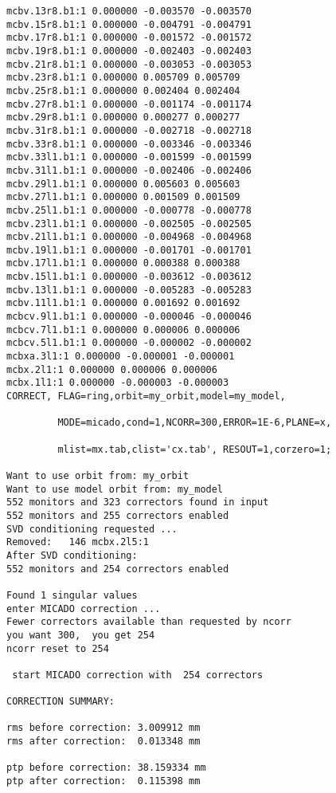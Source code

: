 \begin{verbatim}
mcbv.13r8.b1:1 0.000000 -0.003570 -0.003570
mcbv.15r8.b1:1 0.000000 -0.004791 -0.004791
mcbv.17r8.b1:1 0.000000 -0.001572 -0.001572
mcbv.19r8.b1:1 0.000000 -0.002403 -0.002403
mcbv.21r8.b1:1 0.000000 -0.003053 -0.003053
mcbv.23r8.b1:1 0.000000 0.005709 0.005709
mcbv.25r8.b1:1 0.000000 0.002404 0.002404
mcbv.27r8.b1:1 0.000000 -0.001174 -0.001174
mcbv.29r8.b1:1 0.000000 0.000277 0.000277
mcbv.31r8.b1:1 0.000000 -0.002718 -0.002718
mcbv.33r8.b1:1 0.000000 -0.003346 -0.003346
mcbv.33l1.b1:1 0.000000 -0.001599 -0.001599
mcbv.31l1.b1:1 0.000000 -0.002406 -0.002406
mcbv.29l1.b1:1 0.000000 0.005603 0.005603
mcbv.27l1.b1:1 0.000000 0.001509 0.001509
mcbv.25l1.b1:1 0.000000 -0.000778 -0.000778
mcbv.23l1.b1:1 0.000000 -0.002505 -0.002505
mcbv.21l1.b1:1 0.000000 -0.004968 -0.004968
mcbv.19l1.b1:1 0.000000 -0.001701 -0.001701
mcbv.17l1.b1:1 0.000000 0.000388 0.000388
mcbv.15l1.b1:1 0.000000 -0.003612 -0.003612
mcbv.13l1.b1:1 0.000000 -0.005283 -0.005283
mcbv.11l1.b1:1 0.000000 0.001692 0.001692
mcbcv.9l1.b1:1 0.000000 -0.000046 -0.000046
mcbcv.7l1.b1:1 0.000000 0.000006 0.000006
mcbcv.5l1.b1:1 0.000000 -0.000002 -0.000002
mcbxa.3l1:1 0.000000 -0.000001 -0.000001
mcbx.2l1:1 0.000000 0.000006 0.000006
mcbx.1l1:1 0.000000 -0.000003 -0.000003
CORRECT, FLAG=ring,orbit=my_orbit,model=my_model,

         MODE=micado,cond=1,NCORR=300,ERROR=1E-6,PLANE=x,

         mlist=mx.tab,clist='cx.tab', RESOUT=1,corzero=1;

Want to use orbit from: my_orbit
Want to use model orbit from: my_model
552 monitors and 323 correctors found in input
552 monitors and 255 correctors enabled
SVD conditioning requested ...
Removed:   146 mcbx.2l5:1
After SVD conditioning:             
552 monitors and 254 correctors enabled

Found 1 singular values
enter MICADO correction ...
Fewer correctors available than requested by ncorr
you want 300,  you get 254
ncorr reset to 254
  
 start MICADO correction with  254 correctors
  
CORRECTION SUMMARY:   

rms before correction: 3.009912 mm
rms after correction:  0.013348 mm

ptp before correction: 38.159334 mm
ptp after correction:  0.115398 mm


\end{verbatim}
